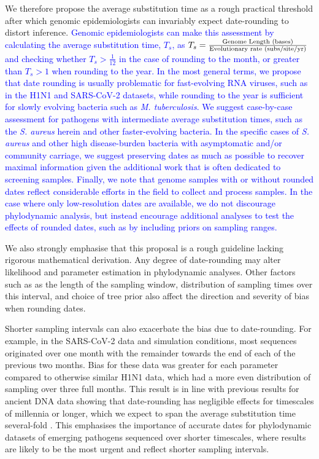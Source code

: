 \documentclass[12pt]{article}
\begin{document}
\begin{spacing}{2}
 We therefore propose the average substitution time as a rough practical threshold after which genomic epidemiologists can invariably expect date-rounding to distort inference. \textcolor{blue}{Genomic epidemiologists can make this assessment by calculating the average substitution time, $T_s$, as $T_s = \frac{\textnormal{Genome Length (bases)}}{\textnormal{Evolutionary rate (subs/site/yr)}}$ and checking whether $T_s > \frac{1}{12}$ in the case of rounding to the month, or greater than $T_s>1$ when rounding to the year. In the most general terms, we propose that date rounding is usually problematic for fast-evolving RNA viruses, such as in the H1N1 and SARS-CoV-2 datasets, while rounding to the year is sufficient for slowly evolving bacteria such as \textit{M. tuberculosis}. We suggest case-by-case assessment for pathogens with intermediate average substitution times, such as the \textit{S. aureus} herein and other faster-evolving bacteria. In the specific cases of \textit{S. aureus} and other high disease-burden bacteria with asymptomatic and/or community carriage, we suggest preserving dates as much as possible to recover maximal information given the additional work that is often dedicated to screening samples. Finally, we note that genome samples with or without rounded dates reflect considerable efforts in the field to collect and process samples. In the case where only low-resolution dates are available, we do not discourage phylodynamic analysis, but instead encourage additional analyses to test the effects of rounded dates, such as by including priors on sampling ranges.}

 We also strongly emphasise that this proposal is a rough guideline lacking rigorous mathematical derivation. Any degree of date-rounding may alter likelihood and parameter estimation in phylodynamic analyses. Other factors such as as the length of the sampling window, distribution of sampling times over this interval, and choice of tree prior also affect the direction and severity of bias when rounding dates.  

Shorter sampling intervals can also exacerbate the bias due to date-rounding. For example, in the SARS-CoV-2 data and simulation conditions, most sequences originated over one month with the remainder towards the end of each of the previous two months. Bias for these data was greater for each parameter compared to otherwise similar H1N1 data, which had a more even distribution of sampling over three full months. This result is in line with previous results for ancient DNA data showing that date-rounding has negligible effects for timescales of millennia or longer, which we expect to span the average substitution time several-fold \citep{molak_2013_phylogenetic}. This emphasises the importance of accurate dates for phylodynamic datasets of emerging pathogens sequenced over shorter timescales, where results are likely to be the most urgent and reflect shorter sampling intervals.


\end{spacing}
\end{document}
